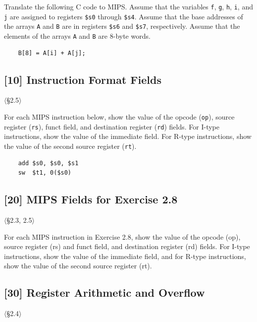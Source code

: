 \noindent Translate the following C code to MIPS. Assume that the variables
\texttt{f}, \texttt{g}, \texttt{h}, \texttt{i}, and \texttt{j} are assigned
to registers \texttt{\$s0} through \texttt{\$s4}. Assume that the base
addresses of the arrays \texttt{A} and \texttt{B} are in registers
\texttt{\$s6} and \texttt{\$s7}, respectively. Assume that the elements of
the arrays \texttt{A} and \texttt{B} are 8-byte words.
\begin{verbatim}
    B[8] = A[i] + A[j];
\end{verbatim}

\problembreak

\subsection{[10] Instruction Format Fields}
\hypertarget{prob-2.8}{}
\noindent$\langle$\S2.5$\rangle$\medskip

\noindent For each MIPS instruction below, show the value of the opcode
(\texttt{op}), source register (\texttt{rs}), funct field, and destination
register (\texttt{rd}) fields. For I-type instructions, show the value of the
immediate field. For R-type instructions, show the value of the second source
register (\texttt{rt}).
\begin{verbatim}
    add $s0, $s0, $s1
    sw  $t1, 0($s0)
\end{verbatim}

\problembreak

\subsection{[20] MIPS Fields for Exercise 2.8}
\hypertarget{prob-2.9}{}
\noindent$\langle$\S2.3, 2.5$\rangle$\medskip

\noindent For each MIPS instruction in Exercise 2.8, show the value of the
opcode (op), source register (rs) and funct field, and destination register
(rd) fields. For I-type instructions, show the value of the immediate field,
and for R-type instructions, show the value of the second source register (rt).

\problembreak

\subsection{[30] Register Arithmetic and Overflow}
\hypertarget{prob-2.10}{}
\noindent$\langle$\S2.4$\rangle$\medskip

